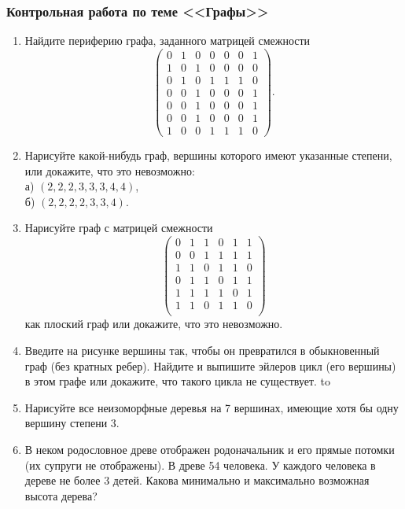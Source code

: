 \documentclass{rpd}
\begin{document}
    \subsubsection*{Контрольная работа по теме <<Графы>>}
        \begin{enumerate}
        \item
        Найдите периферию графа, заданного матрицей смежности\\
        \small
        \[
        \left(
        \begin{array}{ccccccc}
        0&1&0&0&0&0&1\\
        1&0&1&0&0&0&0\\
        0&1&0&1&1&1&0\\
        0&0&1&0&0&0&1\\
        0&0&1&0&0&0&1\\
        0&0&1&0&0&0&1\\
        1&0&0&1&1&1&0
        \end{array}
        \right).
        \]
        \normalsize
        \item
        Нарисуйте какой-нибудь граф, вершины которого имеют указанные степени, или докажите, что это невозможно:\\
        а)  $(2,2,2,3,3,3,4,4)$,\\
        б)  $(2,2,2,2,3,3,4)$.
        \item
        Нарисуйте граф с матрицей смежности 
        \[
        \left(
        \begin{array}{cccccc}
        0 & 1 & 1 & 0 & 1 & 1\\
        0 & 0 & 1 & 1 & 1 & 1\\
        1 & 1 & 0 & 1 & 1 & 0\\
        0 & 1 & 1 & 0 & 1 & 1\\
        1 & 1 & 1 & 1 & 0 & 1\\
        1 & 1 & 0 & 1 & 1 & 0\\
        \end{array}
        \right)
        \]
        как плоский граф или докажите, что это невозможно.
        \item
        Введите на рисунке вершины так, чтобы он превратился в обыкновенный граф (без кратных ребер). Найдите и выпишите эйлеров цикл (его вершины) в этом графе или докажите, что такого цикла не существует. 
        \newline
        \hbox to 

        \item
        Нарисуйте все неизоморфные деревья на 7 вершинах, имеющие хотя бы одну вершину степени 3.
        \item
        В неком родословное древе отображен родоначальник и его прямые потомки (их супруги не отображены). В древе 54 человека. У каждого человека в дереве не более 3 детей. Какова минимально и максимально возможная высота дерева?
        \end{enumerate}
\end{document}
